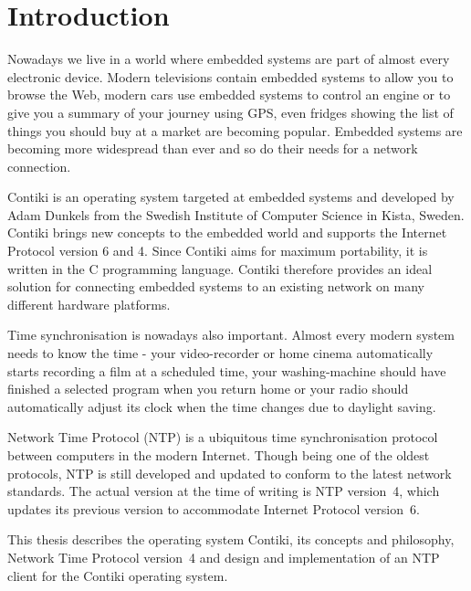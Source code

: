
\chapter{Introduction}
Nowadays we live in a world where embedded systems are part of almost every electronic device.
Modern televisions contain embedded systems to allow you to browse the Web,
modern cars use embedded systems to control an engine or to give you a summary
of your journey using GPS, even fridges showing the list of things you should buy at a market are becoming popular.
Embedded systems are becoming more widespread than ever and so do
their needs for a network connection.

Contiki is an operating system targeted at embedded systems and
developed by Adam Dunkels from the Swedish Institute of Computer Science in Kista, Sweden.
Contiki brings new concepts to the embedded world and supports the Internet Protocol version 6 and 4.
Since Contiki aims for maximum portability, it is written in the C programming language.
Contiki therefore provides an ideal solution for connecting
embedded systems to an existing network on many different hardware platforms.

Time synchronisation is nowadays also important.
Almost every modern system needs to know the time -
your video-recorder or home cinema automatically starts recording a film at a scheduled time,
your washing-machine should have finished a selected program when you return home
or your radio should automatically adjust its clock when the time changes
due to daylight saving.

Network Time Protocol (NTP) is a ubiquitous time synchronisation protocol between computers in the modern Internet.
Though being one of the oldest protocols, NTP is still developed and updated to conform to the latest
network standards. The actual version at the time of writing is NTP version~4, which updates its previous version to
accommodate Internet Protocol version~6.

This thesis describes the operating system Contiki, its concepts and philosophy,
Network Time Protocol version~4 and design and implementation of an NTP client for the Contiki operating system.








